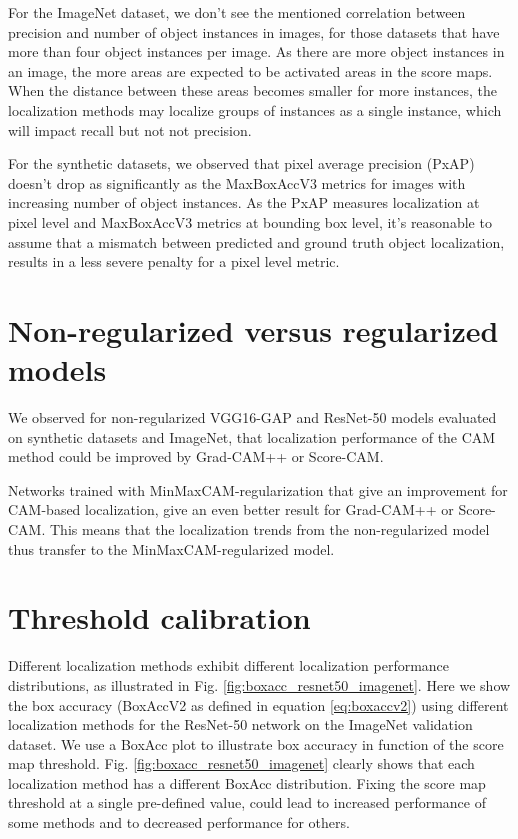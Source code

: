 For the ImageNet dataset, we don't see the mentioned correlation between precision and number of object instances in images, for those datasets that have more than four object instances per image. As there are more object instances in an image, the more areas are expected to be activated areas in the score maps. When the distance between these areas becomes smaller for more instances, the localization methods may localize groups of instances as a single instance, which will impact recall but not not precision.

For the synthetic datasets, we observed that pixel average precision (PxAP) doesn’t drop as significantly as the MaxBoxAccV3 metrics for images with increasing number of object instances. As the PxAP measures localization at pixel level and MaxBoxAccV3 metrics at bounding box level, it's reasonable to assume that a mismatch between predicted and ground truth object localization, results in a less severe penalty for a pixel level metric.

\section{Non-regularized versus regularized models}
We observed for non-regularized VGG16-GAP and ResNet-50 models evaluated on synthetic datasets and ImageNet, that localization performance of the CAM method could be improved by Grad-CAM++ or Score-CAM.

Networks trained with MinMaxCAM-regularization that give an improvement for CAM-based localization, give an even better result for Grad-CAM++ or Score-CAM. This means that the localization trends from the non-regularized model thus transfer to the MinMaxCAM-regularized model.

\section{Threshold calibration}
Different localization methods exhibit different localization performance distributions, as illustrated in Fig. \ref{fig:boxacc_resnet50_imagenet}. Here we show the box accuracy (BoxAccV2 as defined in equation \ref{eq:boxaccv2}) using different localization methods for the ResNet-50 network on the ImageNet validation dataset. We use a BoxAcc plot to illustrate box accuracy in function of the score map threshold. Fig. \ref{fig:boxacc_resnet50_imagenet} clearly shows that each localization method has a different BoxAcc distribution. Fixing the score map threshold at a single pre-defined value, could lead to increased performance of some methods and to decreased performance for others. 

